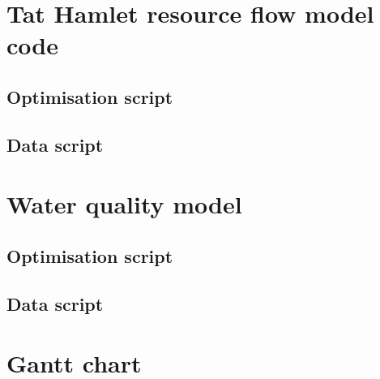 \documentclass{article}
\begin{document}


\tableofcontents
\listoffigures
\listoftables





\appendix
\section{Tat Hamlet resource flow model code} \label{sec:code_tat}
\subsection{Optimisation script}

\clearpage
\subsection{Data script}

\section{Water quality model}
\subsection{Optimisation script}

\clearpage
\subsection{Data script}

\section{Gantt chart} \label{sec:Gantt}




\end{document}

